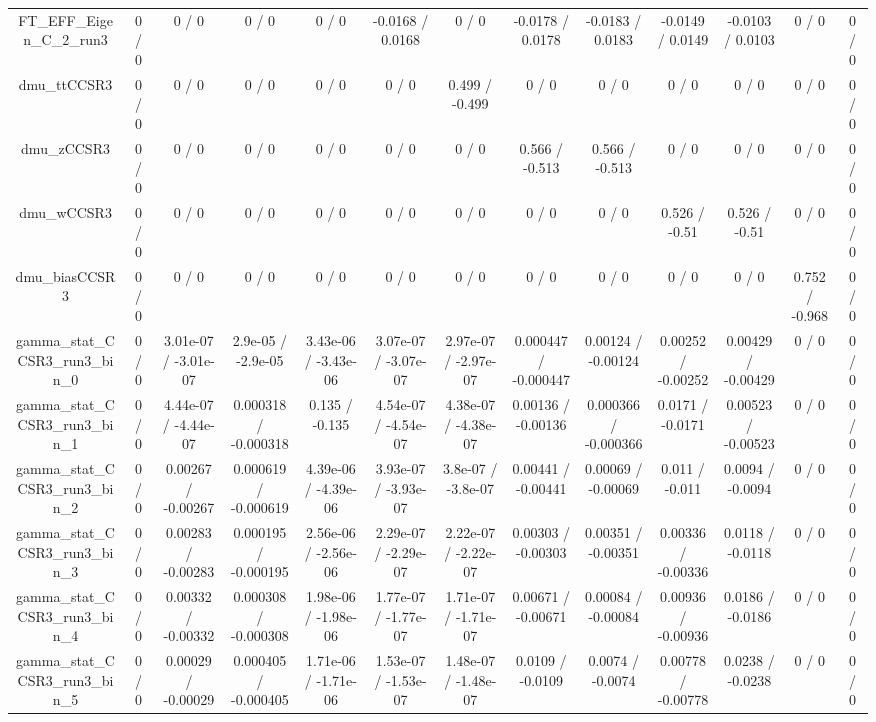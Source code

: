 \documentclass[10pt]{article}
\begin{document}
\begin{table}[htbp]
\begin{center}
\begin{tabular}{|c|c|c|c|c|c|c|c|c|c|c|c|c|}
  FT_EFF_Eigen_C_2_run3 & 0 / 0 & 0 / 0 & 0 / 0 & 0 / 0 & -0.0168 / 0.0168 & 0 / 0 & -0.0178 / 0.0178 & -0.0183 / 0.0183 & -0.0149 / 0.0149 & -0.0103 / 0.0103 & 0 / 0 & 0 / 0 \\ 
  dmu_ttCCSR3 & 0 / 0 & 0 / 0 & 0 / 0 & 0 / 0 & 0 / 0 & 0.499 / -0.499 & 0 / 0 & 0 / 0 & 0 / 0 & 0 / 0 & 0 / 0 & 0 / 0 \\ 
  dmu_zCCSR3 & 0 / 0 & 0 / 0 & 0 / 0 & 0 / 0 & 0 / 0 & 0 / 0 & 0.566 / -0.513 & 0.566 / -0.513 & 0 / 0 & 0 / 0 & 0 / 0 & 0 / 0 \\ 
  dmu_wCCSR3 & 0 / 0 & 0 / 0 & 0 / 0 & 0 / 0 & 0 / 0 & 0 / 0 & 0 / 0 & 0 / 0 & 0.526 / -0.51 & 0.526 / -0.51 & 0 / 0 & 0 / 0 \\ 
  dmu_biasCCSR3 & 0 / 0 & 0 / 0 & 0 / 0 & 0 / 0 & 0 / 0 & 0 / 0 & 0 / 0 & 0 / 0 & 0 / 0 & 0 / 0 & 0.752 / -0.968 & 0 / 0 \\ 
  gamma_stat_CCSR3_run3_bin_0 & 0 / 0 & 3.01e-07 / -3.01e-07 & 2.9e-05 / -2.9e-05 & 3.43e-06 / -3.43e-06 & 3.07e-07 / -3.07e-07 & 2.97e-07 / -2.97e-07 & 0.000447 / -0.000447 & 0.00124 / -0.00124 & 0.00252 / -0.00252 & 0.00429 / -0.00429 & 0 / 0 & 0 / 0 \\ 
  gamma_stat_CCSR3_run3_bin_1 & 0 / 0 & 4.44e-07 / -4.44e-07 & 0.000318 / -0.000318 & 0.135 / -0.135 & 4.54e-07 / -4.54e-07 & 4.38e-07 / -4.38e-07 & 0.00136 / -0.00136 & 0.000366 / -0.000366 & 0.0171 / -0.0171 & 0.00523 / -0.00523 & 0 / 0 & 0 / 0 \\ 
  gamma_stat_CCSR3_run3_bin_2 & 0 / 0 & 0.00267 / -0.00267 & 0.000619 / -0.000619 & 4.39e-06 / -4.39e-06 & 3.93e-07 / -3.93e-07 & 3.8e-07 / -3.8e-07 & 0.00441 / -0.00441 & 0.00069 / -0.00069 & 0.011 / -0.011 & 0.0094 / -0.0094 & 0 / 0 & 0 / 0 \\ 
  gamma_stat_CCSR3_run3_bin_3 & 0 / 0 & 0.00283 / -0.00283 & 0.000195 / -0.000195 & 2.56e-06 / -2.56e-06 & 2.29e-07 / -2.29e-07 & 2.22e-07 / -2.22e-07 & 0.00303 / -0.00303 & 0.00351 / -0.00351 & 0.00336 / -0.00336 & 0.0118 / -0.0118 & 0 / 0 & 0 / 0 \\ 
  gamma_stat_CCSR3_run3_bin_4 & 0 / 0 & 0.00332 / -0.00332 & 0.000308 / -0.000308 & 1.98e-06 / -1.98e-06 & 1.77e-07 / -1.77e-07 & 1.71e-07 / -1.71e-07 & 0.00671 / -0.00671 & 0.00084 / -0.00084 & 0.00936 / -0.00936 & 0.0186 / -0.0186 & 0 / 0 & 0 / 0 \\ 
  gamma_stat_CCSR3_run3_bin_5 & 0 / 0 & 0.00029 / -0.00029 & 0.000405 / -0.000405 & 1.71e-06 / -1.71e-06 & 1.53e-07 / -1.53e-07 & 1.48e-07 / -1.48e-07 & 0.0109 / -0.0109 & 0.0074 / -0.0074 & 0.00778 / -0.00778 & 0.0238 / -0.0238 & 0 / 0 & 0 / 0 \\ 

\end{tabular}
\end{center}
\end{table}
\end{document}
